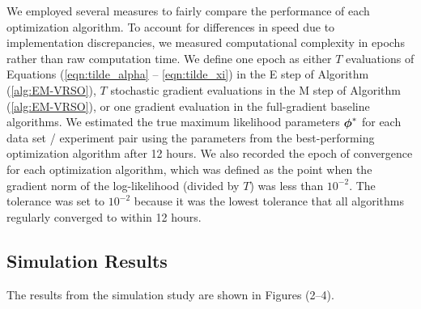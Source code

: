 We employed several measures to fairly compare the performance of each optimization algorithm. To account for differences in speed due to implementation discrepancies, we measured computational complexity in epochs rather than raw computation time. We define one epoch as either $T$ evaluations of Equations (\ref{eqn:tilde_alpha} -- \ref{eqn:tilde_xi}) in the E step of Algorithm (\ref{alg:EM-VRSO}), $T$ stochastic gradient evaluations in the M step of Algorithm (\ref{alg:EM-VRSO}), or one gradient evaluation in the full-gradient baseline algorithms. We estimated the true maximum likelihood parameters $\boldsymbol{\phi}^*$ for each data set / experiment pair using the parameters from the best-performing optimization algorithm after 12 hours. We also recorded the epoch of convergence for each optimization algorithm, which was defined as the point when the gradient norm of the log-likelihood (divided by $T$) was less than $10^{-2}$. The tolerance was set to $10^{-2}$ because it was the lowest tolerance that all algorithms regularly converged to within 12 hours.

\subsection{Simulation Results}

The results from the simulation study are shown in Figures (2--4).

